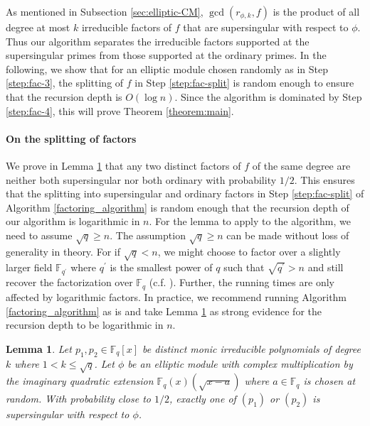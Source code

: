 \documentclass[12pt]{article}
\theoremstyle{plain}
\newtheorem{lemma}[theorem]{Lemma}
\theoremstyle{definition}
\def\F{\ensuremath{\mathbb{F}}}
\begin{document}
As mentioned in Subsection \ref{sec:elliptic-CM}, $\gcd(r_{\phi,k}, f)$ is the product of all 
degree at most $k$ irreducible factors of $f$ that are supersingular with respect to $\phi$. Thus 
our algorithm separates the irreducible factors supported at the supersingular primes from those 
supported at the ordinary primes. In the following, we show that for an elliptic module chosen  
randomly as in Step \ref{step:fac-3}, the splitting of $f$ in Step \ref{step:fac-split} is random 
enough to ensure that the recursion depth is $O(\log n)$. Since the algorithm is dominated by Step 
\ref{step:fac-4}, this will prove Theorem \ref{theorem:main}.

\paragraph{On the splitting of factors}
We prove in Lemma \ref{splitting_lemma} that any two distinct factors of $f$ of the same degree are 
neither both supersingular nor both ordinary with probability $1/2$. This ensures that the 
splitting into supersingular and ordinary factors in Step \ref{step:fac-split} of Algorithm 
\ref{factoring_algorithm} is random enough that the recursion depth of our algorithm is logarithmic 
in $n$. For the lemma to apply to the algorithm, we need to assume $\sqrt{q} \ge n$.  The 
assumption $\sqrt{q} \ge  n$ can be made without loss of generality in theory. For if $\sqrt{q} < 
n$, we might choose to factor over a slightly larger field $\F_{q^\prime}$ where $q^\prime$ is the 
smallest power of $q$ such that $\sqrt{q^\prime} > n$ and still recover the factorization over 
$\F_q$ (c.f. \cite[Remark 3.2]{nar}). Further, the running times are only affected by logarithmic 
factors. In practice, we recommend running Algorithm \ref{factoring_algorithm} as is and take Lemma 
\ref{splitting_lemma} as strong evidence for the recursion depth to be logarithmic in $n$.
\begin{lemma}
\label{splitting_lemma}
	Let $p_1,p_2 \in \F_q[x]$ be distinct monic irreducible polynomials of degree $k$ where $1 < k 
	\le \sqrt{q}$. Let $\phi$ be an elliptic module with complex multiplication by the imaginary 
	quadratic extension $\F_q(x)(\sqrt{x-a})$ where $a \in \F_q$ is chosen at random. With 
	probability close to $1/2$, exactly one of $(p_1)$ or $(p_2)$ is supersingular with respect to 
	$\phi$.
\end{lemma}
\end{document}
